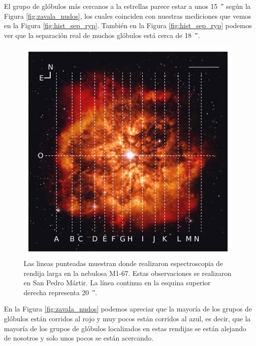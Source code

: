 \documentclass{book}
\begin{document}
El grupo de glóbulos más cercanos a la estrellas parece estar a unos \SI{15}{\arcsecond} según la Figura \ref{fig:zavala_nudos}, los cuales coinciden con nuestras mediciones que vemos en la Figura \ref{fig:hist_sep_ryp}. También en la Figura \ref{fig:hist_sep_ryp} podemos ver que la separación real de muchos glóbulos está cerca de \SI{18}{\arcsecond}.

\begin{figure}[htb]
    \centering
    \includegraphics[width=\textwidth]{Nuevas imagenes finales/rendijas_zavala.pdf}
    \caption{Las lineas punteadas muestran donde \cite{Zavala:2022} realizaron espectroscopia de rendija larga en la nebulosa M1-67. Estas observaciones se realizaron en San Pedro Mártir. La línea continua en la esquina superior derecha representa \SI{20}{\arcsecond}.}
    \label{fig:zavala_rendijas_nebula}
\end{figure}

En la Figura \ref{fig:zavala_nudos} podemos apreciar que la mayoría de los grupos de glóbulos están corridos al rojo y muy pocos están corridos al azul, es decir, que la mayoría de los grupos de glóbulos localizados en estas rendijas se están alejando de nosotros y solo unos pocos se están acercando.
\end{document}
